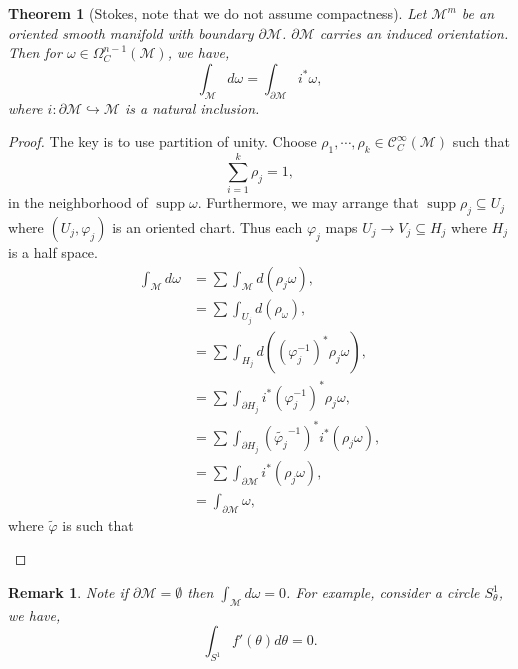 \documentclass[10pt]{article}
\newtheorem{theorem}{Theorem} [section]
\newtheorem{remark}{Remark}[section]
\DeclareMathOperator{\supp}{supp}
\newcommand{\M}[0]{\mathcal{M}}
\newcommand{\cinf}[0]{\mathcal{C}^\infty}
\begin{document}
\begin{theorem}[Stokes, note that we do not assume compactness]
  Let $\M^m$ be an oriented smooth manifold with boundary $\partial\M$. $\partial\M$ carries an induced orientation. Then for $\omega\in\Omega_C^{n-1}(\M)$, we have, 
  \begin{equation*}
    \int_\M d\omega = \int_{\partial \M}i^*\omega, 
  \end{equation*}
  where $i:\partial\M\hookrightarrow\M$ is a natural inclusion.
\end{theorem}

\begin{proof}
  The key is to use partition of unity. Choose $\rho_1,\cdots,\rho_k\in\cinf_C(\M)$ such that 
  \begin{equation*}
    \sum_{i=1}^k \rho_j = 1,
  \end{equation*}
  in the neighborhood of $\supp\omega$. Furthermore, we  may arrange that $\supp\rho_j\subseteq U_j$ where $(U_j,\varphi_j)$ is an oriented chart. Thus each $\varphi_j$ maps $U_j\to V_j\subseteq H_j$ where $H_j$ is a half space.
  \begin{align*}
    \int_\M d\omega & = \sum\int_\M d(\rho_j\omega),\\
    &= \sum\int_{U_j}d(\rho_\omega),\\
    & = \sum\int_{H_j}d((\varphi_j^{-1})^*\rho_j\omega),\\
    & = \sum\int_{\partial H_j}i^*(\varphi_j^{-1})^*\rho_j\omega,\\
    & = \sum\int_{\partial H_j}(\tilde{\varphi_j}^{-1})^*i^*(\rho_j\omega),\\
    & = \sum\int_{\partial\M}i^*(\rho_j\omega),\\
    & = \int_{\partial\M}\omega,
  \end{align*}
  where $\tilde{\varphi}$ is such that 
  \begin{center}
  \end{center}
\end{proof}

\begin{remark}
  Note if $\partial\M=\emptyset$ then $\int_\M d\omega = 0$. For example, consider a circle $S^1_\theta$, we have,
  \begin{equation*}
    \int_{S^1}f'(\theta)d\theta = 0.
  \end{equation*}
\end{remark}
\end{document}
